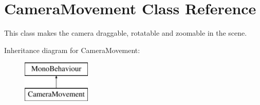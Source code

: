 \hypertarget{class_camera_movement}{}\section{Camera\+Movement Class Reference}
\label{class_camera_movement}


This class makes the camera draggable, rotatable and zoomable in the scene.  


Inheritance diagram for Camera\+Movement\+:\begin{figure}[H]
\begin{center}
\leavevmode
\includegraphics[height=2.000000cm]{class_camera_movement}
\end{center}
\end{figure}
